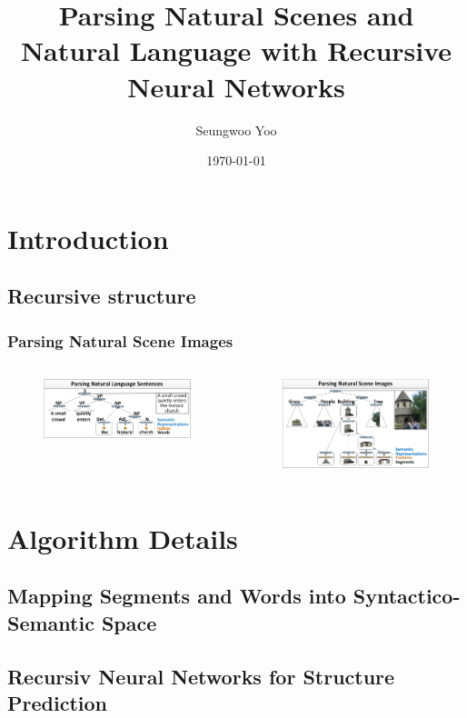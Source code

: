 \documentclass{beamer}
\title{Parsing Natural Scenes and Natural Language with Recursive Neural Networks}
\author{Seungwoo Yoo}
\date{\today}
\begin{document}
\frame{\titlepage}

\section[Outline]{}
\frame{\tableofcontents}

\section{Introduction}
\subsection{Recursive structure}
\frame
{
  \frametitle{Parsing Natural Scene Images}
   \begin{columns}
  \begin{figure}[ht]  
	  \begin{center}
		  \includegraphics[width=2.1in]{images/fig1.png}   
	  \end{center}   
  \end{figure}
  \begin{figure}[ht]
	  \begin{center}
		  \includegraphics[width=2.1in]{images/fig2.png} 
	  \end{center}
  \end{figure}
  \end{columns}
}
\section{Algorithm Details}
\subsection{Mapping Segments and Words into Syntactico-Semantic Space}
\frame
{
}
\subsection{Recursiv Neural Networks for Structure Prediction}
\frame
{
}
\end{document}
